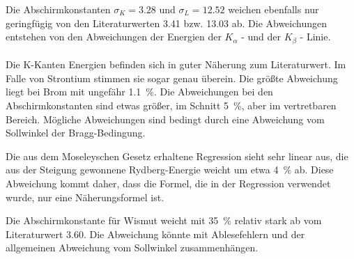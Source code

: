 Die Abschirmkonstanten $\sigma_K = \num{3.28}$ und $\sigma_L = \num{12.52}$ weichen ebenfalls
nur geringfügig von den Literaturwerten 3.41 bzw. 13.03 ab. Die Abweichungen entstehen von den Abweichungen
der Energien der $K_\alpha$ - und der $K_\beta$ - Linie. \\
\\
Die K-Kanten Energien befinden sich in guter Näherung zum Literaturwert. Im Falle von
Strontium stimmen sie sogar genau überein. Die größte Abweichung liegt bei Brom mit ungefähr
\SI{1.1}{\percent}. Die Abweichungen bei den Abschirmkonstanten sind etwas größer, im Schnitt
\SI{5}{\percent}, aber im vertretbaren Bereich. Mögliche Abweichungen sind bedingt durch eine Abweichung
vom Sollwinkel der Bragg-Bedingung.

Die aus dem Moseleyschen Gesetz erhaltene Regression sieht sehr linear aus, die aus der
Steigung gewonnene Rydberg-Energie weicht um etwa \SI{4}{\percent} ab. Diese Abweichung kommt daher,
dass die Formel, die in der Regression verwendet wurde, nur eine Näherungsformel ist.

Die Abschirmkonstante für Wismut weicht mit \SI{35}{\percent} relativ stark ab vom Literaturwert
\num{3.60}. Die Abweichung könnte mit Ablesefehlern und der allgemeinen Abweichung vom Sollwinkel
zusammenhängen.
\newpage
\nocite{*}
\printbibliography
